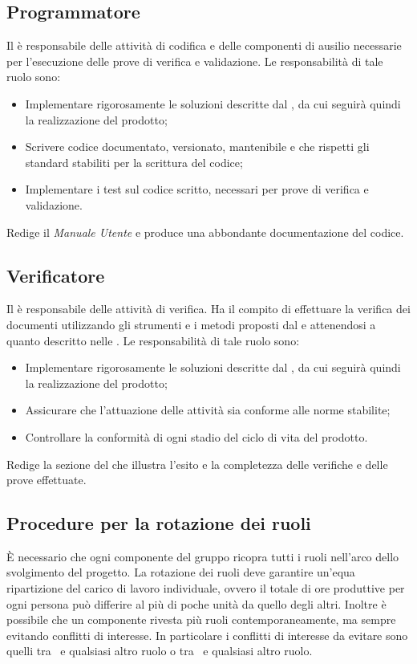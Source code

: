 \documentclass[12pt,a4paper]{article}
\begin{document}
\subsection{Programmatore}
Il \PR{} è responsabile delle attività di codifica e delle componenti di ausilio necessarie per l'esecuzione delle prove di verifica e validazione. Le responsabilità di tale ruolo sono:
\begin{itemize}
	\item Implementare rigorosamente le soluzioni descritte dal \PG{}, da cui seguirà quindi la realizzazione del prodotto;
	\item Scrivere codice documentato, versionato, mantenibile e che rispetti gli standard stabiliti per la scrittura del codice;
	\item Implementare i test sul codice scritto, necessari per prove di verifica e validazione.
\end{itemize}
Redige il \textit{Manuale Utente} e produce una abbondante documentazione del codice.

\subsection{Verificatore}
Il \VR{} è responsabile delle attività di verifica. Ha il compito di effettuare la verifica dei documenti utilizzando gli strumenti e i metodi proposti dal \PdQ{} e attenendosi a quanto descritto nelle \NdP{}. 
Le responsabilità di tale ruolo sono:
\begin{itemize}
	\item Implementare rigorosamente le soluzioni descritte dal \PG{}, da cui seguirà quindi la realizzazione del prodotto;
	\item Assicurare che l'attuazione delle attività sia conforme alle norme stabilite;
	\item Controllare la conformità di ogni stadio del ciclo di vita del prodotto.
\end{itemize}
Redige la sezione del \PdQ{} che illustra l'esito e la completezza delle verifiche
e delle prove effettuate.

\subsection{Procedure per la rotazione dei ruoli}
È necessario che ogni componente del gruppo ricopra tutti i ruoli nell'arco dello svolgimento del progetto. La rotazione dei ruoli deve garantire un'equa ripartizione del carico di lavoro individuale, ovvero il totale di ore produttive per ogni persona può differire al più di poche unità da quello degli altri. Inoltre è possibile che un componente rivesta più ruoli contemporaneamente, ma sempre evitando conflitti di interesse. In particolare i conflitti di interesse da evitare sono quelli tra \PM\ e qualsiasi altro ruolo o tra \VR\ e qualsiasi altro ruolo.
\newpage
\end{document}
